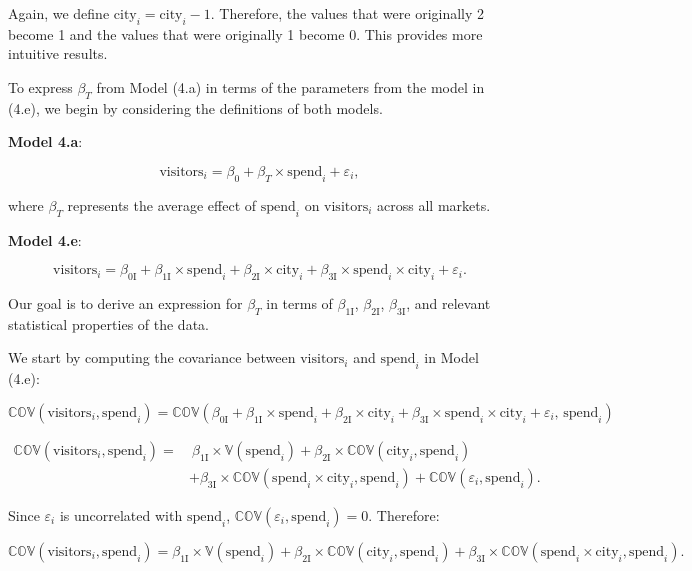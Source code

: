 \documentclass{article}
\begin{document}
Again, we define $\text{city}_i = \text{city}_i - 1$. Therefore, the values that were originally 2 become 1 and the values that were originally 1 become 0. This provides more intuitive results.

To express \(\beta_T\) from Model (4.a) in terms of the parameters from the model in (4.e), we begin by considering the definitions of both models.

\textbf{Model 4.a}:

\[
\text{visitors}_i = \beta_0 + \beta_T \times \text{spend}_i + \varepsilon_i,
\]

where \(\beta_T\) represents the average effect of \(\text{spend}_i\) on \(\text{visitors}_i\) across all markets.

\textbf{Model 4.e}:

\[
\text{visitors}_i = \beta_{0 \text{I}} + \beta_{1 \text{I}} \times \text{spend}_i + \beta_{2 \text{I}} \times \text{city}_i + \beta_{3 \text{I}} \times \text{spend}_i \times \text{city}_i + \varepsilon_i.
\]

Our goal is to derive an expression for \(\beta_T\) in terms of \(\beta_{1 \text{I}}\), \(\beta_{2 \text{I}}\), \(\beta_{3 \text{I}}\), and relevant statistical properties of the data.

We start by computing the covariance between \(\text{visitors}_i\) and \(\text{spend}_i\) in Model (4.e):

$$
\mathbb{COV}(\text{visitors}_i, \text{spend}_i)
= \mathbb{COV}(\beta_{0 \text{I}} + \beta_{1 \text{I}} \times \text{spend}_i + \beta_{2 \text{I}} \times \text{city}_i + \beta_{3 \text{I}} \times \text{spend}_i \times \text{city}_i + \varepsilon_i, \, \text{spend}_i)
$$

\begin{align*}
\mathbb{COV}(\text{visitors}_i, \text{spend}_i)
=& \ \beta_{1 \text{I}} \times \mathbb{V}(\text{spend}_i) + \beta_{2 \text{I}} \times \mathbb{COV}(\text{city}_i, \text{spend}_i) \\
&+ \beta_{3 \text{I}} \times \mathbb{COV}(\text{spend}_i \times \text{city}_i, \text{spend}_i) + \mathbb{COV}(\varepsilon_i, \text{spend}_i).
\end{align*}

Since \(\varepsilon_i\) is uncorrelated with \(\text{spend}_i\), \(\mathbb{COV}(\varepsilon_i, \text{spend}_i) = 0\). Therefore:

\[
\mathbb{COV}(\text{visitors}_i, \text{spend}_i) = \beta_{1 \text{I}} \times \mathbb{V}(\text{spend}_i) + \beta_{2 \text{I}} \times \mathbb{COV}(\text{city}_i, \text{spend}_i) + \beta_{3 \text{I}} \times \mathbb{COV}(\text{spend}_i \times \text{city}_i, \text{spend}_i).
\]
\end{document}
